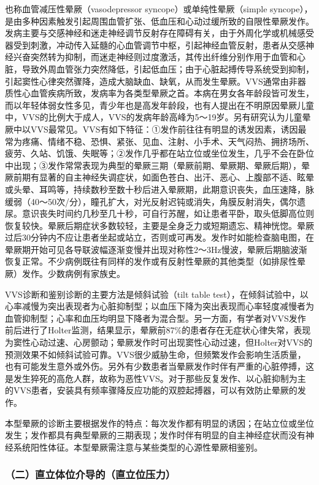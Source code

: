 也称血管减压性晕厥（vasodepressor syncope）或单纯性晕厥（simple
syncope），是由多种因素触发引起周围血管扩张、低血压和心动过缓所致的自限性晕厥发作。发病主要与交感神经和迷走神经调节反射存在障碍有关，由于外周化学或机械感受器受到刺激，冲动传入延髓的心血管调节中枢，引起神经血管反射，患者从交感神经兴奋突然转为抑制，而迷走神经则过度激活，其传出纤维分别作用于血管和心脏，导致外周血管张力突然降低，引起低血压；由于心脏起搏传导系统受到抑制，引起窦性心律突然骤降，造成大脑缺血、缺氧，从而发生晕厥。VVS通常由非器质性心血管疾病所致，发病率为各类型晕厥之首。本病在男女各年龄段皆可发生，而以年轻体弱女性多见，青少年也是高发年龄段，也有人提出在不明原因晕厥儿童中，VVS的比例大于成人，VVS的发病年龄高峰为5～19岁。另有研究认为儿童晕厥中以VVS最常见。VVS有如下特征：①发作前往往有明显的诱发因素，诱因最常为疼痛、情绪不稳、恐惧、紧张、见血、注射、小手术、天气闷热、拥挤场所、疲劳、久站、饥饿、失眠等；②发作几乎都在站立位或坐位发生，几乎不会在卧位中出现；③发作常常表现为典型的晕厥三期（晕厥前期、晕厥期、晕厥后期），晕厥前期有显著的自主神经失调症状，如面色苍白、出汗、恶心、上腹部不适、眩晕或头晕、耳鸣等，持续数秒至数十秒后进入晕厥期，此期意识丧失，血压速降，脉缓弱（40～50次/分），瞳孔扩大，对光反射迟钝或消失，角膜反射消失，偶尔遗尿。意识丧失时间约几秒至几十秒，可自行苏醒，如让患者平卧，取头低脚高位则恢复较快。晕厥后期症状多数较轻，主要是全身乏力或短期遗忘、精神恍惚。晕厥过后30分钟内不应让患者坐起或站立，否则或可再发。发作时如能检查脑电图，在晕厥期开始可见各导联波幅逐渐变慢并出现对称性2～3Hz慢波，晕厥后期脑波渐恢复正常。不少病例既往有同样的发作或有反射性晕厥的其他类型（如排尿性晕厥）发作。少数病例有家族史。

VVS诊断和鉴别诊断的主要方法是倾斜试验（tilt table
test），在倾斜试验中，以心率减慢为突出表现者为心脏抑制型；以血压下降为突出表现而心率轻度减慢者为血管抑制型；心率和血压均明显下降者为混合型。另一方面，有学者对VVS发作前后进行了Holter监测，结果显示，晕厥前87\%的患者存在无症状心律失常，表现为窦性心动过速、心房颤动；晕厥发作时可出现窦性心动过速，但Holter对VVS的预测效果不如倾斜试验可靠。VVS很少威胁生命，但频繁发作会影响生活质量，也有可能发生意外或外伤。另外有少数患者当晕厥发作时伴有严重的心脏停搏，这是发生猝死的高危人群，故称为恶性VVS。对于那些反复发作、以心脏抑制为主的VVS患者，安装具有频率骤降反应功能的双腔起搏器，可以有效防止晕厥的发作。

本型晕厥的诊断主要根据发作的特点：每次发作都有明显的诱因；在站立位或坐位发生；发作都具有典型晕厥的三期表现；发作时伴有明显的自主神经症状而没有神经系统阳性体征。本型晕厥需注意与某些类型的心源性晕厥相鉴别。

\subsubsection{（二）直立体位介导的（直立位压力）}

